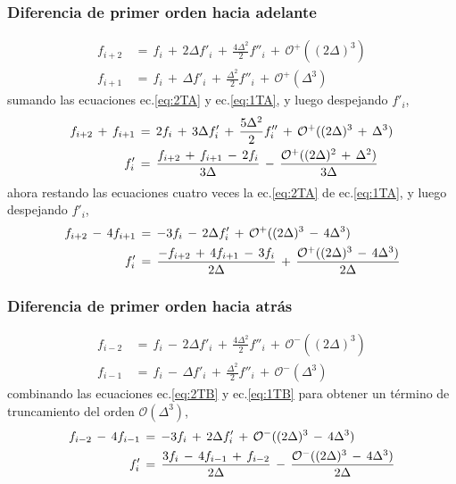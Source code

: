 \documentclass[9pt,technote,twoside,letterpaper,onecolumn]{IEEEtran}
\begin{document}
\subsubsection{Diferencia de primer orden hacia adelante}
\label{sec:dif1D2Oa}
\begin{align}
  f_{i+2}&\,=\,f_i\,+\,2\Delta f'_i\,+\,\frac{4\Delta^2}{2}f''_i\,+\,\mathcal{O}^+((2\Delta)^3)  
  \label{eq:2TA}\\
  f_{i+1}&\,=\,f_i\,+\,\Delta f'_i\,+\,\frac{\Delta^2}{2}f''_i\,+\,\mathcal{O}^+(\Delta^3)  
  \label{eq:1TA}
\end{align}
sumando las ecuaciones ec.\ref{eq:2TA} y ec.\ref{eq:1TA}, y luego despejando $f'_i$,
\begin{align}
  f_{i+2}\,+\,f_{i+1}&\,=\,2f_i\,+\,3\Delta f'_i\,+\,\frac{5\Delta^2}{2}f''_i\,+\,\mathcal{O}^+((2\Delta)^3\,+\,\Delta^3)\notag\\
  f'_i&\,=\,\frac{f_{i+2}\,+\,f_{i+1}\,-\,2f_i}{3\Delta}\,-\,\frac{\mathcal{O}^+((2\Delta)^2\,+\,\Delta^2)}{3\Delta}
    \label{eq:2ordA}
\end{align}
ahora restando las ecuaciones cuatro veces la ec.\ref{eq:2TA} de ec.\ref{eq:1TA}, y luego despejando $f'_i$,
\begin{align}
  f_{i+2}\,-\,4f_{i+1}&\,=\,-3f_i\,-\,2\Delta f'_i\,+\,\mathcal{O}^+((2\Delta)^3\,-\,4\Delta^3)\notag\\
  f'_i&\,=\,\frac{-f_{i+2}\,+\,4f_{i+1}\,-\,3f_i}{2\Delta}\,+\,\frac{\mathcal{O}^+((2\Delta)^3\,-\,4\Delta^3)}{2\Delta}
    \label{eq:2ordAO3}
\end{align}

\subsubsection{Diferencia de primer orden hacia atrás}
\label{sec:dif1D2Ob}
\begin{align}
  f_{i-2}&\,=\,f_i\,-\,2\Delta f'_i\,+\,\frac{4\Delta^2}{2}f''_i\,+\,\mathcal{O}^-((2\Delta)^3)  
  \label{eq:2TB}\\
  f_{i-1}&\,=\,f_i\,-\,\Delta f'_i\,+\,\frac{\Delta^2}{2}f''_i\,+\,\mathcal{O}^-(\Delta^3)  
  \label{eq:1TB}
\end{align}
combinando las ecuaciones ec.\ref{eq:2TB} y ec.\ref{eq:1TB} para obtener un término de truncamiento del orden $\mathcal{O}(\Delta^3)$,
\begin{align}
  f_{i-2}\,-\,4f_{i-1}&\,=\,-3f_i\,+\,2\Delta f'_i\,+\,\mathcal{O}^-((2\Delta)^3\,-\,4\Delta^3)\notag\\
  f'_i&\,=\,\frac{3f_{i}\,-\,4f_{i-1}\,+\,f_{i-2}}{2\Delta}\,-\,\frac{\mathcal{O}^-((2\Delta)^3\,-\,4\Delta^3)}{2\Delta}
    \label{eq:2ordB}
\end{align}
\end{document}
